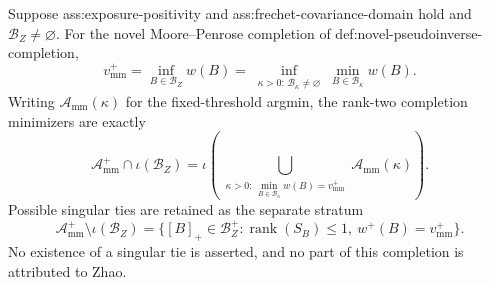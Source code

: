 Suppose ass:exposure-positivity and ass:frechet-covariance-domain hold and \(\mathcal B_Z\ne\varnothing\).  For the novel Moore--Penrose completion of def:novel-pseudoinverse-completion,
\[
v_{\mathrm{mm}}^+
=\inf_{B\in\mathcal B_Z}w(B)
=\inf_{\substack{\kappa>0:\,\mathcal B_\kappa\ne\varnothing}}
\min_{B\in\mathcal B_\kappa}w(B).
\]
Writing \(\mathcal A_{\mathrm{mm}}(\kappa)\) for the fixed-threshold argmin, the rank-two completion minimizers are exactly
\[
\mathcal A_{\mathrm{mm}}^+\cap\iota(\mathcal B_Z)
=\iota\!\left(
\bigcup_{\substack{\kappa>0:\,
\min_{B\in\mathcal B_\kappa}w(B)=v_{\mathrm{mm}}^+}}
\mathcal A_{\mathrm{mm}}(\kappa)\right).
\]
Possible singular ties are retained as the separate stratum
\[
\mathcal A_{\mathrm{mm}}^+\setminus\iota(\mathcal B_Z)
=\{[B]_+\in\mathcal B_Z^+:\operatorname{rank}(S_B)\le1,\ w^+(B)=v_{\mathrm{mm}}^+\}.
\]
No existence of a singular tie is asserted, and no part of this completion is attributed to Zhao.